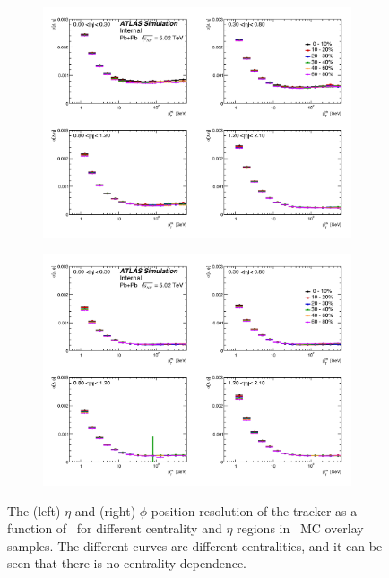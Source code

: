\begin{figure}
\begin{subfigure}{.5\textwidth}
\centering \includegraphics[width=1.\textwidth]{figures/main/corrections/trk_res_eta_ppTight.pdf}
\caption{}
\end{subfigure}
\begin{subfigure}{.5\textwidth}  
\centering \includegraphics[width=1.\textwidth]{figures/main/corrections/trk_res_phi_ppTight.pdf}
\caption{}
\end{subfigure}
\caption{The (left) $\eta$ and (right) $\phi$ position resolution of the tracker as a function of \pttruth\ for different centrality and $\eta$ regions in \pbpb\ MC overlay samples.
The different curves are different centralities, and it can be seen that there is no centrality dependence.}
\label{fig:trk_posResolution}
\end{figure}


